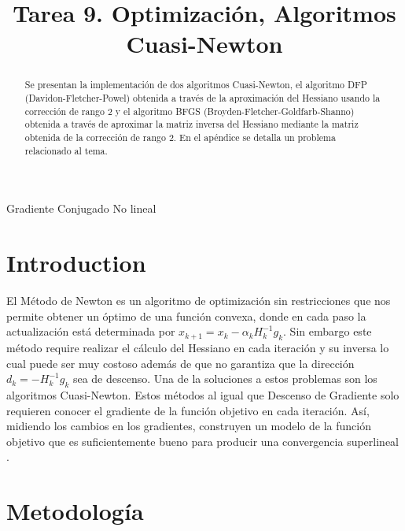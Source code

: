 \documentclass[conference]{IEEEtran}
\begin{document}
\title{Tarea 9. Optimización, Algoritmos Cuasi-Newton}

\author{
}

\maketitle

\begin{abstract}

Se presentan la implementación de dos algoritmos Cuasi-Newton, el algoritmo DFP
(Davidon-Fletcher-Powel) obtenida a través de la aproximación del Hessiano usando la corrección de rango 2 y
el algoritmo BFGS (Broyden-Fletcher-Goldfarb-Shanno) obtenida a través de aproximar la matriz
inversa del Hessiano mediante la matriz obtenida de la corrección de rango 2. En el apéndice se
detalla un problema relacionado al tema.


\end{abstract}

\begin{IEEEkeywords}
Gradiente Conjugado No lineal
\end{IEEEkeywords}

\section{Introduction}

El Método de Newton es un algoritmo de optimización sin restricciones que nos permite obtener un
óptimo de una función convexa, donde en cada paso la actualización está determinada por
$x_{k+1} = x_k - \alpha_k H_k^{-1}g_k$. Sin embargo este método require realizar el cálculo del
Hessiano en cada iteración y su inversa lo cual puede ser muy costoso además de que no garantiza que
la dirección $d_k = - H_k^{-1}g_k$ sea de descenso. Una de la soluciones a estos problemas son los
algoritmos Cuasi-Newton. Estos métodos al igual que Descenso de Gradiente solo requieren conocer el
gradiente de la función objetivo en cada iteración. Así, midiendo los cambios en los gradientes,
construyen un modelo de la función objetivo que es suficientemente bueno para producir una
convergencia superlineal \cite{b1}. \\

\section{Metodología}
\end{document}
